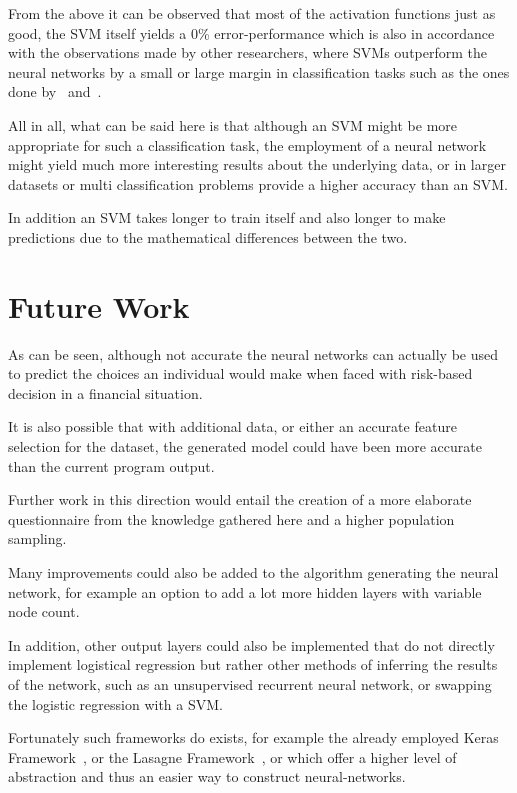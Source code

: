 \documentclass[12pt]{article}
\begin{document}
From the above it can be observed that most of the activation functions just as good, the SVM itself yields a 0\% error-performance which is also in accordance with the observations made by other researchers, where SVMs outperform the neural networks by a small or large margin in classification tasks such as the ones done by~\citet{1006.5902.pdf} and~\citet{caruana.icml06.pdf}. 

All in all, what can be said here is that although an SVM might be more appropriate for such a classification task, the employment of a neural network might yield much more interesting results about the underlying data, or in larger datasets or multi classification problems provide a higher accuracy than an SVM\@. 

In addition an SVM takes longer to train itself and also longer to make predictions due to the mathematical differences between the two.

\section{Future Work}
\label{sec:future_work}

As can be seen, although not accurate the neural networks can actually be used to predict the choices an individual would make when faced with risk-based decision in a financial situation. 

It is also possible that with additional data, or either an accurate feature selection for the dataset, the generated model could have been more accurate than the current program output. 

Further work in this direction would entail the creation of a more elaborate questionnaire from the knowledge gathered here and a higher population sampling.

Many improvements could also be added to the algorithm generating the neural network, for example an option to add a lot more hidden layers with variable node count. 

In addition, other output layers could also be implemented that do not directly implement logistical regression but rather other methods of inferring the results of the network, such as an unsupervised recurrent neural network, or swapping the logistic regression with a SVM. 

Fortunately such frameworks do exists, for example the already employed Keras Framework~\citep{keras}, or the Lasagne Framework~\citep{lasagne}, or which offer a higher level of abstraction and thus an easier way to construct neural-networks. 
\end{document}
